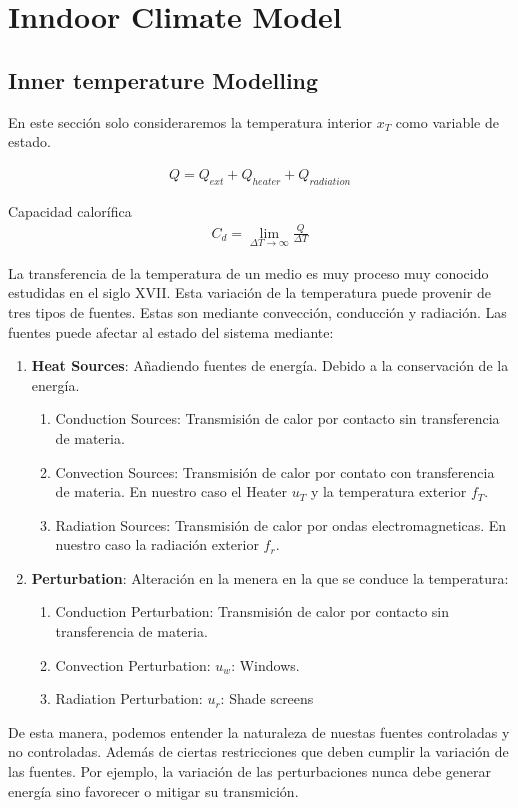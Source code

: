 
    \chapter{Inndoor Climate Model}

    
    \section{Inner temperature Modelling}

    En este sección solo consideraremos la temperatura interior $x_{T}$ como variable de estado.
    
    \begin{gather}
        Q = Q_{ext} + Q_{heater} + Q_{radiation}
    \end{gather}
    
    Capacidad calorífica 
    \begin{gather}
        C_d = \lim_{\Delta T \to \infty}\frac{Q}{\Delta T}
    \end{gather}
    
    La transferencia de la temperatura de un medio es muy proceso muy conocido estudidas en el siglo XVII. Esta variación de la temperatura puede provenir de tres tipos de fuentes. Estas son mediante convección, conducción y radiación. Las fuentes puede afectar al estado del sistema mediante:
    \begin{enumerate}
        \item \textbf{Heat Sources}: Añadiendo fuentes de energía. Debido a la conservación de la energía.
        \begin{enumerate}
            \item Conduction Sources: Transmisión de calor por contacto sin transferencia de materia.
            \item Convection Sources: Transmisión de calor por contato con transferencia de materia. En nuestro caso el Heater $u_T$ y la temperatura exterior $f_T$.
            \item Radiation Sources: Transmisión de calor por ondas electromagneticas. En nuestro caso la radiación exterior $f_r$.
        \end{enumerate}
        \item \textbf{Perturbation}: Alteración en la menera en la que se conduce la temperatura:
        \begin{enumerate}
            \item Conduction Perturbation: Transmisión de calor por contacto sin transferencia de materia.
            \item Convection Perturbation: $u_w$: Windows.
            \item Radiation Perturbation:  $u_r$:             Shade screens
        \end{enumerate}
    \end{enumerate}
    De esta manera, podemos entender la naturaleza de nuestas fuentes controladas y no controladas. Además de ciertas restricciones que deben cumplir la variación de las fuentes. Por ejemplo, la variación de las perturbaciones nunca debe generar energía sino favorecer o mitigar su transmición. 
    
